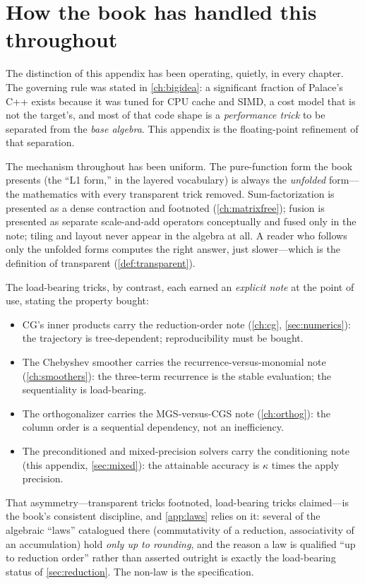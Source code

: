 \section{How the book has handled this throughout}
\label{sec:throughout}

The distinction of this appendix has been operating, quietly, in every chapter. The
governing rule was stated in \cref{ch:bigidea}: a significant fraction of Palace's
C++ exists because it was tuned for CPU cache and SIMD, a cost model that is not the
target's, and most of that code shape is a \emph{performance trick} to be separated
from the \emph{base algebra}. This appendix is the floating-point refinement of that
separation.

The mechanism throughout has been uniform. The pure-function form the book presents
(the ``L1 form,'' in the layered vocabulary) is always the \emph{unfolded} form---the
mathematics with every transparent trick removed. Sum-factorization is presented as a
dense contraction and footnoted (\cref{ch:matrixfree}); fusion is presented as
separate scale-and-add operators conceptually and fused only in the note; tiling and
layout never appear in the algebra at all. A reader who follows only the unfolded
forms computes the right answer, just slower---which is the definition of transparent
(\cref{def:transparent}).

The load-bearing tricks, by contrast, each earned an \emph{explicit note} at the
point of use, stating the property bought:
\begin{itemize}[leftmargin=1.4em, nosep]
\item CG's inner products carry the reduction-order note (\cref{ch:cg},
  \cref{sec:numerics}): the trajectory is tree-dependent; reproducibility must be
  bought.
\item The Chebyshev smoother carries the recurrence-versus-monomial note
  (\cref{ch:smoothers}): the three-term recurrence is the stable evaluation; the
  sequentiality is load-bearing.
\item The orthogonalizer carries the MGS-versus-CGS note (\cref{ch:orthog}): the
  column order is a sequential dependency, not an inefficiency.
\item The preconditioned and mixed-precision solvers carry the conditioning note
  (this appendix, \cref{sec:mixed}): the attainable accuracy is $\kappa$ times the
  apply precision.
\end{itemize}
That asymmetry---transparent tricks footnoted, load-bearing tricks claimed---is the
book's consistent discipline, and \cref{app:laws} relies on it: several of the
algebraic ``laws'' catalogued there (commutativity of a reduction, associativity of
an accumulation) hold \emph{only up to rounding}, and the reason a law is qualified
``up to reduction order'' rather than asserted outright is exactly the load-bearing
status of \cref{sec:reduction}. The non-law is the specification.

